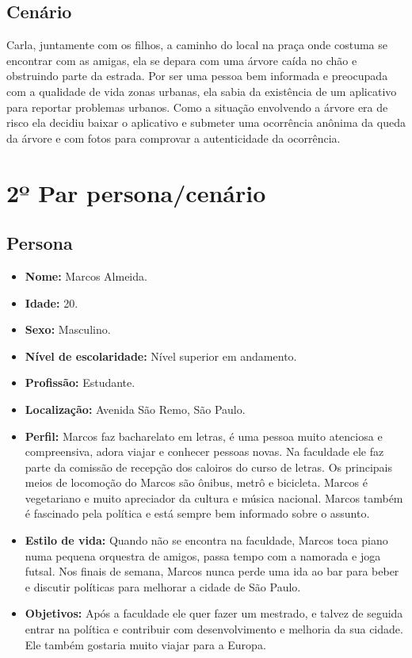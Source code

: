 \documentclass[a4paper,12pt,twoside]{report}
\begin{document}
\subsection{Cenário}
Carla, juntamente com os filhos, a caminho do local na praça onde costuma se encontrar com as amigas, ela se depara com uma árvore caída no chão e obstruindo parte da estrada. Por ser uma pessoa bem informada e preocupada com a qualidade de vida zonas urbanas, ela sabia da existência de um aplicativo para reportar problemas urbanos. Como a situação envolvendo a árvore era de risco ela decidiu baixar o aplicativo e submeter uma ocorrência anônima da queda da árvore e com fotos para comprovar a autenticidade da ocorrência.

\section{2º Par persona/cenário}
\subsection{Persona}
\begin{itemize}
\item \textbf{Nome:} Marcos Almeida.
\item \textbf{Idade:} 20.
\item \textbf{Sexo:} Masculino.
\item \textbf{Nível de escolaridade:} Nível superior em andamento.
\item \textbf{Profissão:} Estudante.
\item \textbf{Localização:} Avenida São Remo, São Paulo.
\item \textbf{Perfil:} Marcos faz bacharelato em letras, é uma pessoa muito atenciosa e compreensiva, adora viajar e conhecer pessoas novas. Na faculdade ele faz parte da comissão de recepção dos caloiros do curso de letras. Os principais meios de locomoção do Marcos são ônibus, metrô e bicicleta. Marcos é vegetariano e muito apreciador da cultura e música nacional. Marcos também é fascinado pela política e está sempre bem informado sobre o assunto.   
\item \textbf{Estilo de vida:} Quando não se encontra na faculdade, Marcos toca piano numa pequena orquestra de amigos, passa tempo com a namorada e joga futsal. Nos finais de semana, Marcos nunca perde uma ida ao bar para beber e discutir políticas para melhorar a cidade de São Paulo. 
\item \textbf{Objetivos:} Após a faculdade ele quer fazer um mestrado, e talvez de seguida entrar na política e contribuir com desenvolvimento e melhoria da sua cidade. Ele também gostaria muito viajar para a Europa.
\end{itemize}
\end{document}
